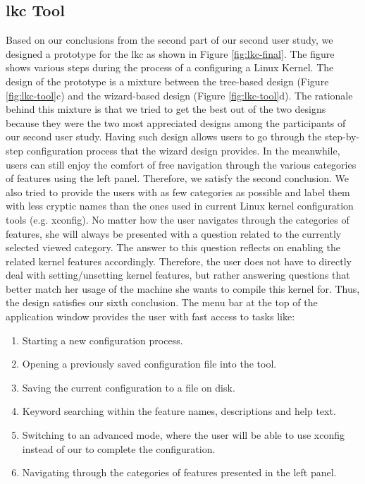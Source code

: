 \documentclass{chi2009}
\begin{document}
\subsection{\textsf{lkc} Tool}
Based on our conclusions from the second part of our second user study, we designed a prototype for the \textsf{lkc} as shown in Figure \ref{fig:lkc-final}. The
figure shows various steps during the process of a configuring a Linux Kernel. The design of the prototype is a mixture between the tree-based design (Figure
\ref{fig:lkc-tool}c) and the wizard-based design (Figure \ref{fig:lkc-tool}d). The rationale behind this mixture is that we tried to get the best out of the two
designs because they were the two most appreciated designs among the participants of our second user study. Having such design allows users to go through the
step-by-step configuration process that the wizard design provides. In the meanwhile, users can still enjoy the comfort of free navigation through the various
categories of features using the left panel. Therefore, we satisfy the second conclusion. We also tried to provide the users with as few categories as possible
and label them with less cryptic names than the ones used in current Linux kernel configuration tools (e.g. \textsf{xconfig}). No matter how the user navigates
through the categories of features, she will always be presented with a question related to the currently selected viewed category. The answer to this question
reflects on enabling the related kernel features accordingly. Therefore, the user does not have to directly deal with setting/unsetting kernel features, but
rather answering questions that better match her usage of the machine she wants to compile this kernel for. Thus, the design satisfies our sixth conclusion. The
menu bar at the top of the application window provides the user with fast access to tasks like:
\begin{enumerate}
 \item Starting a new configuration process.
 \item Opening a previously saved configuration file into the tool.
 \item Saving the current configuration to a file on disk.
 \item Keyword searching within the feature names, descriptions and help text.
 \item Switching to an advanced mode, where the user will be able to use \textsf{xconfig} instead of our to complete the configuration.
 \item Navigating through the categories of features presented in the left panel.
\end{enumerate}
\end{document}
